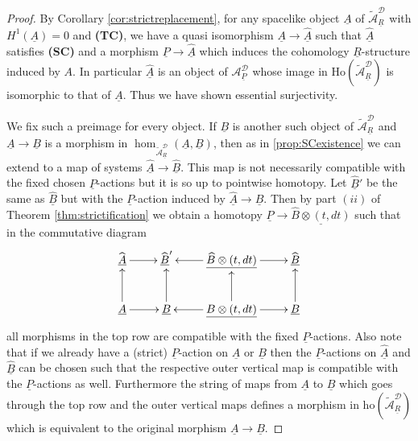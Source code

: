 \documentclass[12pt,a4paper]{article}
\theoremstyle{definition}
\begin{document}
\begin{proof}
By Corollary \ref{cor:strictreplacement}, for any spacelike object $\underline{A}$ of $\widetilde{\mathcal{A}}^\mathcal{D}_{\underline{R}}$ with $H^1(\underline{A})=0$ and \textbf{(TC)}, we have a quasi isomorphism $\underline{A}\rightarrow \widehat{\underline{A}}$ such that $\widehat{\underline{A}}$ satisfies \textbf{(SC)} and a morphism $\underline{P}\rightarrow \widehat{\underline{A}}$ which induces the cohomology $\underline{R}$-structure induced by $A$. In particular $\widehat{\underline{A}}$ is an object of ${\mathcal{A}}^\mathcal{D}_{\underline{P}}$ whose image in $\mathrm{Ho}(\widetilde{\mathcal{A}}^\mathcal{D}_{\underline{R}})$ is isomorphic to that of $\underline{A}$. Thus we have shown essential surjectivity.

We fix such a preimage for every object. If $\underline{B}$ is another such object of $\widetilde{\mathcal{A}}^\mathcal{D}_{\underline{R}}$ and $\underline{A}\rightarrow \underline{B}$ is a morphism in $\hom_{\widetilde{\mathcal{A}}^\mathcal{D}_{\underline{R}}}(\underline{A},\underline{B})$, then as in \ref{prop:SCexistence} we can extend to a map of systems $\widehat{\underline{A}}\rightarrow\widehat{\underline{B}}$. This map is not necessarily compatible with the fixed chosen $\underline{P}$-actions but it is so up to pointwise homotopy. Let $\widehat{\underline{B}}'$ be the same as $\widehat{\underline{B}}$ but with the $\underline{P}$-action induced by $\underline{\widehat{A}}\rightarrow \underline{\widehat{B}}$. Then
by part $(ii)$ of Theorem \ref{thm:strictification} we obtain a homotopy $\underline{P}\rightarrow \underline{\widehat{B}\otimes (t,dt)}$ such that in the commutative diagram
\[\xymatrix{
\widehat{\underline{A}}\ar[r] & \widehat{\underline{B}}' & \underline{\widehat{B}\otimes (t,dt)}\ar[l]\ar[r] & \widehat{\underline{B}}\\
{\underline{A}}\ar[r]\ar[u] & {\underline{B}}\ar[u] & \underline{{B}\otimes (t,dt)}\ar[u]\ar[l]\ar[r] & {\underline{B}}\ar[u]
}\]
all morphisms in the top row are compatible with the fixed $\underline{P}$-actions. Also note that if we already have a (strict) $\underline{P}$-action on $\underline{A}$ or $\underline{B}$ then the $\underline{P}$-actions on $\widehat{\underline{A}}$ and $\widehat{\underline{B}}$ can be chosen such that the respective outer vertical map is compatible with the $\underline{P}$-actions as well. Furthermore the string of maps  from $\underline{A}$ to $\underline{B}$ which goes through the top row and the outer vertical maps defines a morphism in $\mathrm{ho}(\widetilde{\mathcal{A}}^\mathcal{D}_{\underline{R}})$ which is equivalent to the original morphism $\underline{A}\rightarrow \underline{B}$.


\end{proof}
\end{document}
